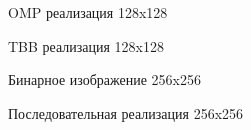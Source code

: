 \documentclass{report}
\begin{document}
\begin{figure}[H]
\caption{OMP реализация 128x128}
\end{figure}

\begin{figure}[H]
\caption{TBB реализация 128x128}
\end{figure}

\begin{figure}[H]
\caption{Бинарное изображение 256x256}
\end{figure}

\begin{figure}[H]
\caption{Последовательная реализация 256x256}
\end{figure}
\end{document}
